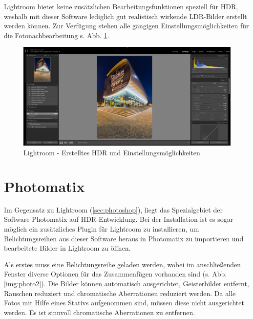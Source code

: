 \documentclass[liststotoc,bibtotoc,fontsize=14pt,]{scrreprt}
\begin{document}
		Lightroom bietet keine zusätzlichen Bearbeitungsfunktionen speziell für HDR, weshalb mit dieser Software lediglich gut realistisch wirkende LDR-Bilder erstellt werden können. Zur Verfügung stehen alle gängigen Einstellungsmöglichkeiten für die Fotonachbearbeitung s. Abb. \ref{img:light_3}.
		
		\bigskip
		\begin{figure}[H]
			\includegraphics[width=\linewidth]{img/lightroom3.png}
			\caption{Lightroom - Erstelltes HDR und Einstellungsmöglichkeiten}
			\label{img:light_3}
		\end{figure}
	
	\section{Photomatix}
	\label{sec:photomatix}
		Im Gegensatz zu Lightroom (\ref{sec:photoshop}), liegt das Spezialgebiet der Software Photomatix auf HDR-Entwicklung. Bei der Installation ist es sogar möglich ein zusätzliches Plugin für Lightroom zu installieren, um Belichtungsreihen aus dieser Software heraus in Photomatix zu importieren und bearbeitete Bilder in Lightroom zu öffnen.
		
		Als erstes muss eine Belichtungsreihe geladen werden, wobei im anschließenden Fenster diverse Optionen für das Zusammenfügen vorhanden sind (s. Abb. \ref{img:photo2}). Die Bilder können automatisch ausgerichtet, Geisterbilder entfernt, Rauschen reduziert und chromatische Aberrationen reduziert werden. Da alle Fotos mit Hilfe eines Stativs aufgenommen sind, müssen diese nicht ausgerichtet werden. Es ist sinnvoll chromatische Aberrationen zu entfernen.
		
\end{document}
